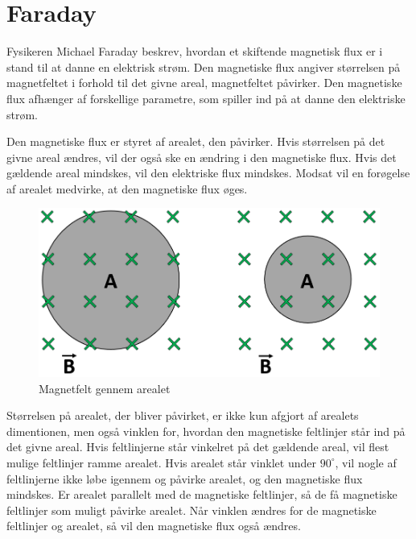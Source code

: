 \section{Faraday}
Fysikeren Michael Faraday beskrev, hvordan et skiftende magnetisk flux er i stand til at danne en elektrisk strøm. Den magnetiske flux angiver størrelsen på magnetfeltet i forhold til det givne areal, magnetfeltet påvirker. Den magnetiske flux afhænger af forskellige parametre, som spiller ind på at danne den elektriske strøm.

Den magnetiske flux er styret af arealet, den påvirker. Hvis størrelsen på det givne areal ændres, vil der også ske en ændring i den magnetiske flux. Hvis det gældende areal mindskes, vil den elektriske flux mindskes. Modsat vil en forøgelse af arealet medvirke, at den magnetiske flux øges.

\begin{figure}[H]
\includegraphics[scale=0.5]{Vildledning/Schematics/Areal_Bfelt}
\caption{Magnetfelt gennem arealet}
\end{figure}

Størrelsen på arealet, der bliver påvirket, er ikke kun afgjort af arealets dimentionen, men også vinklen for, hvordan den magnetiske feltlinjer står ind på det givne areal. Hvis feltlinjerne står vinkelret på det gældende areal, vil flest mulige feltlinjer ramme arealet. Hvis arealet står vinklet under $90^\circ$, vil nogle af feltlinjerne ikke løbe igennem og påvirke arealet, og den magnetiske flux mindskes. Er arealet parallelt med de magnetiske feltlinjer, så de få magnetiske feltlinjer som muligt påvirke arealet. Når vinklen ændres for de magnetiske feltlinjer og arealet, så vil den magnetiske flux også ændres.

